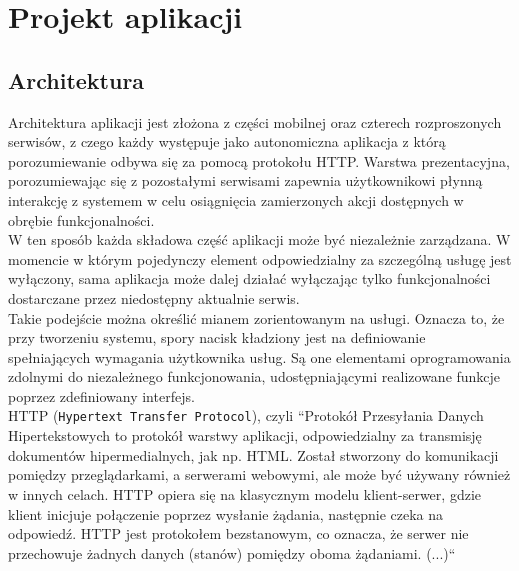 \chapter{Projekt aplikacji}

\section{Architektura}

Architektura aplikacji jest złożona z części mobilnej oraz czterech rozproszonych serwisów, z czego każdy występuje jako autonomiczna aplikacja z którą porozumiewanie odbywa się za pomocą protokołu HTTP. Warstwa prezentacyjna, porozumiewając się z pozostałymi serwisami zapewnia użytkownikowi płynną interakcję z systemem w celu osiągnięcia zamierzonych akcji dostępnych w obrębie funkcjonalności.\\
W ten sposób każda składowa część aplikacji może być niezależnie zarządzana. W momencie w którym pojedynczy element odpowiedzialny za szczególną usługę jest wyłączony, sama aplikacja może dalej działać wyłączając tylko funkcjonalności dostarczane przez niedostępny aktualnie serwis.\\
\linebreak
Takie podejście można określić mianem zorientowanym na usługi. Oznacza to, że przy tworzeniu systemu, spory nacisk kładziony jest na definiowanie spełniających wymagania użytkownika usług. Są one elementami oprogramowania zdolnymi do niezależnego funkcjonowania, udostępniającymi realizowane funkcje poprzez zdefiniowany interfejs.\\
\linebreak
HTTP (\texttt{Hypertext Transfer Protocol}), czyli ``Protokół Przesyłania Danych Hipertekstowych to protokół warstwy aplikacji, odpowiedzialny za transmisję dokumentów hipermedialnych, jak np. HTML. Został stworzony do komunikacji pomiędzy przeglądarkami, a serwerami webowymi, ale może być używany również w innych celach. HTTP opiera się na klasycznym modelu klient-serwer, gdzie klient inicjuje połączenie poprzez wysłanie żądania, następnie czeka na odpowiedź. HTTP jest protokołem bezstanowym, co oznacza, że serwer nie przechowuje żadnych danych (stanów) pomiędzy oboma żądaniami. (...)``\cite{http}
\linebreak

